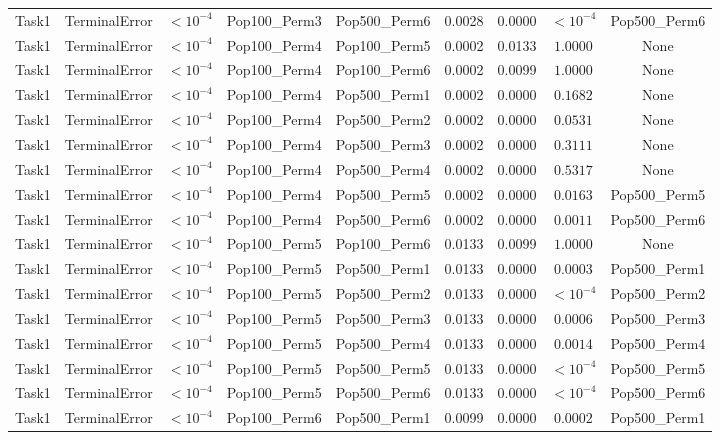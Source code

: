 \documentclass[8pt]{article}
\begin{document}
\begin{longtable}{llccccccc}
Task1 & TerminalError & $< 10^{-4}$ & Pop100\_Perm3 & Pop500\_Perm6 & 0.0028 & 0.0000 & $< 10^{-4}$ & Pop500\_Perm6 \\
Task1 & TerminalError & $< 10^{-4}$ & Pop100\_Perm4 & Pop100\_Perm5 & 0.0002 & 0.0133 & $1.0000$ & None \\
Task1 & TerminalError & $< 10^{-4}$ & Pop100\_Perm4 & Pop100\_Perm6 & 0.0002 & 0.0099 & $1.0000$ & None \\
Task1 & TerminalError & $< 10^{-4}$ & Pop100\_Perm4 & Pop500\_Perm1 & 0.0002 & 0.0000 & $0.1682$ & None \\
Task1 & TerminalError & $< 10^{-4}$ & Pop100\_Perm4 & Pop500\_Perm2 & 0.0002 & 0.0000 & $0.0531$ & None \\
Task1 & TerminalError & $< 10^{-4}$ & Pop100\_Perm4 & Pop500\_Perm3 & 0.0002 & 0.0000 & $0.3111$ & None \\
Task1 & TerminalError & $< 10^{-4}$ & Pop100\_Perm4 & Pop500\_Perm4 & 0.0002 & 0.0000 & $0.5317$ & None \\
Task1 & TerminalError & $< 10^{-4}$ & Pop100\_Perm4 & Pop500\_Perm5 & 0.0002 & 0.0000 & $0.0163$ & Pop500\_Perm5 \\
Task1 & TerminalError & $< 10^{-4}$ & Pop100\_Perm4 & Pop500\_Perm6 & 0.0002 & 0.0000 & $0.0011$ & Pop500\_Perm6 \\
Task1 & TerminalError & $< 10^{-4}$ & Pop100\_Perm5 & Pop100\_Perm6 & 0.0133 & 0.0099 & $1.0000$ & None \\
Task1 & TerminalError & $< 10^{-4}$ & Pop100\_Perm5 & Pop500\_Perm1 & 0.0133 & 0.0000 & $0.0003$ & Pop500\_Perm1 \\
Task1 & TerminalError & $< 10^{-4}$ & Pop100\_Perm5 & Pop500\_Perm2 & 0.0133 & 0.0000 & $< 10^{-4}$ & Pop500\_Perm2 \\
Task1 & TerminalError & $< 10^{-4}$ & Pop100\_Perm5 & Pop500\_Perm3 & 0.0133 & 0.0000 & $0.0006$ & Pop500\_Perm3 \\
Task1 & TerminalError & $< 10^{-4}$ & Pop100\_Perm5 & Pop500\_Perm4 & 0.0133 & 0.0000 & $0.0014$ & Pop500\_Perm4 \\
Task1 & TerminalError & $< 10^{-4}$ & Pop100\_Perm5 & Pop500\_Perm5 & 0.0133 & 0.0000 & $< 10^{-4}$ & Pop500\_Perm5 \\
Task1 & TerminalError & $< 10^{-4}$ & Pop100\_Perm5 & Pop500\_Perm6 & 0.0133 & 0.0000 & $< 10^{-4}$ & Pop500\_Perm6 \\
Task1 & TerminalError & $< 10^{-4}$ & Pop100\_Perm6 & Pop500\_Perm1 & 0.0099 & 0.0000 & $0.0002$ & Pop500\_Perm1 \\

\end{longtable}
\end{document}
